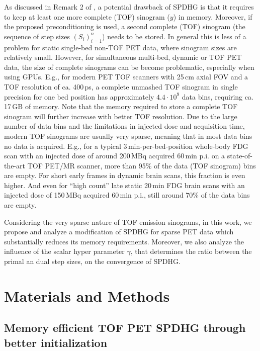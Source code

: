 \documentclass[11pt,twocolumn,twoside]{article}
\begin{document}
As discussed in Remark 2 of \cite{Ehrhardt2019}, a potential drawback of SPDHG is that it requires
to keep at least one more complete (TOF) sinogram ($y$) in memory. 
Moreover, if the proposed preconditioning is used, a second complete (TOF) sinogram
(the sequence of step sizes $(S_i)_{i=1}^n$) needs to be stored.
In general this is less of a problem for static single-bed non-TOF PET data, where sinogram sizes
are relatively small.
However, for simultaneous multi-bed, dynamic or TOF PET data, the size of complete sinograms
can be become problematic, especially when using GPUs.
E.g., for modern PET TOF scanners with 25\,cm axial FOV and a TOF resolution of ca. 400\,ps, 
a complete unmashed TOF sinogram in single precision for one bed position 
has approximately $4.4\cdot10^9$ data bins, requiring ca. 17\,GB of memory.
Note that the memory required to store a complete TOF sinogram will further 
increase with better TOF resolution.
Due to the large number of data bins and the limitations in injected dose and acquisition time,
modern TOF sinograms are usually very sparse, meaning that in most data bins no data is
acquired.
E.g., for a typical 3\,min-per-bed-position whole-body FDG scan with an injected dose 
of around 200\,MBq acquired 60\,min p.i. on a state-of-the-art TOF PET/MR scanner, 
more than 95\% of the data (TOF sinogram) bins are empty.
For short early frames in dynamic brain scans, this fraction is even higher.
And even for ``high count'' late static 20\,min FDG brain scans with an injected dose of 150\,MBq
acquired 60\,min p.i., still around 70\% of the data bins are empty.

\smallskip

Considering the very sparse nature of TOF emission sinograms,
in this work, we propose and analyze a modification of SPDHG for sparse PET data
which substantially reduces its memory requirements.
Moreover, we also analyze the influence of the scalar hyper parameter $\gamma$, that determines
the ratio between the primal an dual step sizes, on the convergence of SPDHG.




\section{Materials and Methods}

\subsection{Memory efficient TOF PET SPDHG through better initialization}
\end{document}
